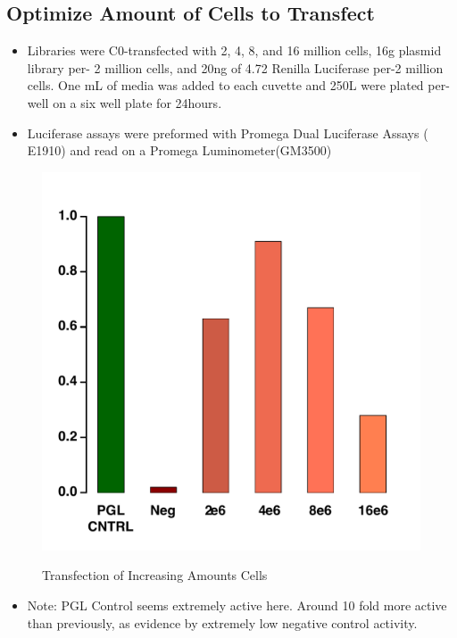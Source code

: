 \documentclass[a4paper]{article}
\begin{document}
   	\subsection{Optimize Amount of Cells to Transfect}
		\begin{itemize}
        	\item Libraries were C0-transfected with 2, 4, 8, and 16 million cells, 16\textmu g plasmid library per- 2 million cells, and 20ng of 4.72 Renilla Luciferase per-2 million cells. One mL of media was added to each cuvette and 250\textmu L were plated per-well on a six well plate for 24hours. 
            
          	 \item Luciferase assays were preformed with Promega Dual Luciferase Assays (	E1910) and read on a Promega Luminometer(GM3500) 
        
        \end{itemize}
    
   		\begin{figure}[H]
			\centering
			\includegraphics[width=1\textwidth]{2016_07_21_HC_diff_CellsFINAL.pdf}
			\label{fig:cell_Amt}
			\caption{Transfection of Increasing Amounts Cells}
        \end{figure}
		
        \begin{itemize}
        	\item Note: PGL Control seems extremely active here. Around 10 fold more active than previously, as evidence by extremely low negative control activity. 
        
        \end{itemize}
\end{document}
